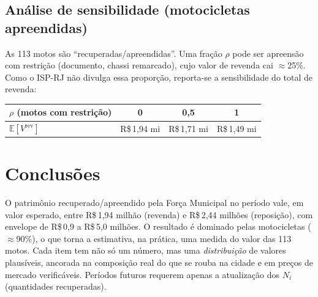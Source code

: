 \documentclass[11pt,a4paper]{article}
\newcommand{\reais}[1]{R\$\,#1}
\begin{document}
\subsection{Análise de sensibilidade (motocicletas apreendidas)}
As 113 motos são ``recuperadas/apreendidas''. Uma fração $\rho$ pode ser apreensão com restrição
(documento, chassi remarcado), cujo valor de revenda cai $\approx$25\%. Como o ISP-RJ não divulga
essa proporção, reporta-se a sensibilidade do total de revenda:
\begin{center}\small
\begin{tabular}{lccc}
\toprule
$\rho$ (motos com restrição) & 0 & 0,5 & 1 \\
\midrule
$\mathbb{E}[V^{\text{rev}}]$ & \reais{1{,}94} mi & \reais{1{,}71} mi & \reais{1{,}49} mi \\
\bottomrule
\end{tabular}
\end{center}

\section{Conclusões}
O patrimônio recuperado/apreendido pela Força Municipal no período vale, em valor esperado, entre
\reais{1{,}94} milhão (revenda) e \reais{2{,}44} milhões (reposição), com envelope de \reais{0{,}9}
a \reais{5{,}0} milhões. O resultado é dominado pelas motocicletas ($\approx$90\%), o que torna a
estimativa, na prática, uma medida do valor das 113 motos. Cada item tem não só um número, mas uma
\emph{distribuição} de valores plausíveis, ancorada na composição real do que se rouba na cidade e
em preços de mercado verificáveis. Períodos futuros requerem apenas a atualização dos $N_i$
(quantidades recuperadas).

\end{document}
